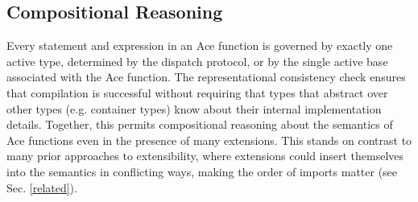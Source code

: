 \documentclass[10pt,preprint]{sigplanconf}
\begin{document}
{\subsection{Compositional Reasoning}\label{safety}
Every statement and expression in an Ace function is governed by exactly one active type, determined by the dispatch protocol, or by the single active base associated with the Ace function. The representational consistency check ensures that compilation is successful without requiring that types that abstract over other types (e.g. container types) know about their internal implementation details. Together, this permits compositional reasoning about the semantics of Ace functions even in the presence of many extensions. This stands on contrast to many prior approaches to extensibility, where extensions could insert themselves into the semantics in conflicting ways, making the order of imports matter (see Sec. \ref{related}). 

}
\end{document}
